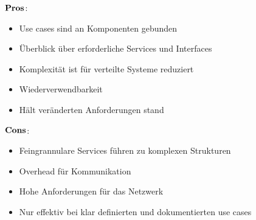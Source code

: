 \begin{multicols}{2}
$\bold{Pros}$:
\begin{itemize}
	\item Use cases sind an Komponenten gebunden
	\item Überblick über erforderliche Services und Interfaces
	\item Komplexität ist für verteilte Systeme reduziert
	\item Wiederverwendbarkeit
	\item Hält veränderten Anforderungen stand
\end{itemize}
\columnbreak
$\bold{Cons}$:
\begin{itemize}
	\item Feingrannulare Services führen zu komplexen Strukturen
	\item Overhead für Kommunikation
	\item Hohe Anforderungen für das Netzwerk
	\item Nur effektiv bei klar definierten und dokumentierten use cases
\end{itemize}
\end{multicols}

